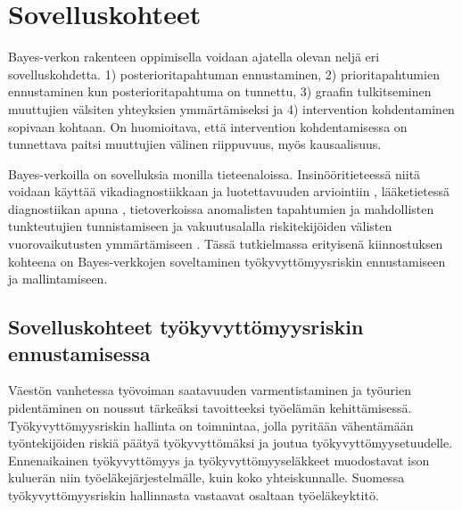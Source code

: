 \chapter{Sovelluskohteet\label{applications}}
Bayes-verkon rakenteen oppimisella voidaan ajatella olevan neljä eri sovelluskohdetta. 1) posterioritapahtuman ennustaminen, 2) prioritapahtumien ennustaminen kun posterioritapahtuma on tunnettu, 3) graafin tulkitseminen muuttujien välsiten yhteyksien ymmärtämiseksi ja 4) intervention kohdentaminen sopivaan kohtaan. On huomioitava, että intervention kohdentamisessa on tunnettava paitsi muuttujien välinen riippuvuus, myös kausaalisuus.

Bayes-verkoilla on sovelluksia monilla tieteenaloissa. Insinööritieteessä niitä voidaan käyttää vikadiagnostiikkaan ja luotettavuuden arviointiin \citep{zhang_brief_2019}, lääketietessä diagnostiikan apuna \citep{mittal_review_2011}, tietoverkoissa anomalisten tapahtumien ja mahdollisten tunkteutujien tunnistamiseen \citep{kaur_review_2013} ja vakuutusalalla riskitekijöiden välisten vuorovaikutusten ymmärtämiseen \citep{ramsahai_connecting_2020}. Tässä tutkielmassa erityisenä kiinnostuksen kohteena on Bayes-verkkojen soveltaminen työkyvyttömyysriskin ennustamiseen ja mallintamiseen.

\section{Sovelluskohteet työkyvyttömyysriskin ennustamisessa}
Väestön vanhetessa työvoiman saatavuuden varmentistaminen ja työurien pidentäminen on noussut tärkeäksi tavoitteeksi työelämän kehittämisessä. Työkyvyttömyysriskin hallinta on toimnintaa, jolla pyritään vähentämään työntekijöiden riskiä päätyä työkyvyttömäksi ja joutua työkyvyttömyysetuudelle. Ennenaikainen työkyvyttömyys ja työkyvyttömyyseläkkeet muodostavat ison kuluerän niin työeläkejärjestelmälle, kuin koko yhteiskunnalle. Suomessa työkyvyttömyysriskin hallinnasta vastaavat osaltaan työeläkeyktitö.

